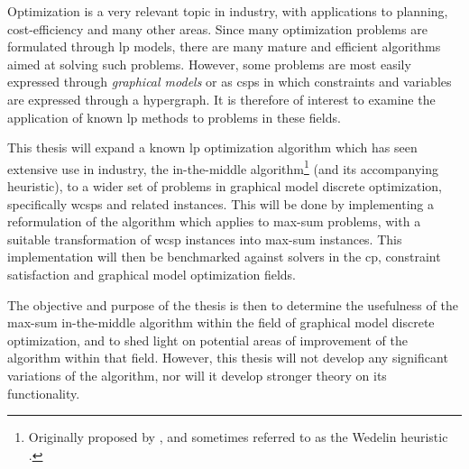 Optimization is a very relevant topic in industry, with applications to planning, cost-efficiency and many other areas.
Since many optimization problems are formulated through \gls{lp} models, there are many mature and efficient algorithms aimed at solving such problems.
However, some problems are most easily expressed through \emph{graphical models} or as \glspl{csp} in which constraints and variables are expressed through a hypergraph.
It is therefore of interest to examine the application of known \gls{lp} methods to problems in these fields.

This thesis will expand a known \gls{lp} optimization algorithm which has seen extensive use in industry, the in-the-middle algorithm\footnote{Originally proposed by \textcite{Wedelin95}, and sometimes referred to as the Wedelin heuristic \parencite{Bastert10}.} (and its accompanying heuristic), to a wider set of problems in graphical model discrete optimization, specifically \glspl{wcsp} and related instances.
This will be done by implementing a reformulation of the algorithm \parencite[due to][]{Wedelin08} which applies to max-sum problems, with a suitable transformation of \gls{wcsp} instances into max-sum instances.
This implementation will then be benchmarked against solvers in the \gls{cp}, constraint satisfaction and graphical model optimization fields.

The objective and purpose of the thesis is then to determine the usefulness of the max-sum in-the-middle algorithm within the field of graphical model discrete optimization, and to shed light on potential areas of improvement of the algorithm within that field.
However, this thesis will not develop any significant variations of the algorithm, nor will it develop stronger theory on its functionality.
